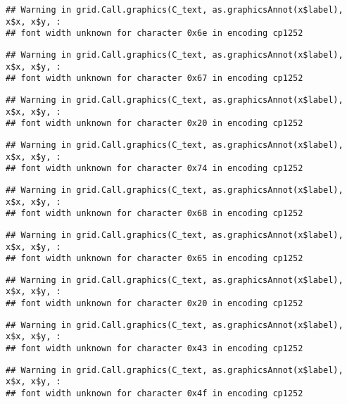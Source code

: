 \documentclass[
]{article}
\begin{document}
\begin{verbatim}
## Warning in grid.Call.graphics(C_text, as.graphicsAnnot(x$label), x$x, x$y, :
## font width unknown for character 0x6e in encoding cp1252
\end{verbatim}

\begin{verbatim}
## Warning in grid.Call.graphics(C_text, as.graphicsAnnot(x$label), x$x, x$y, :
## font width unknown for character 0x67 in encoding cp1252
\end{verbatim}

\begin{verbatim}
## Warning in grid.Call.graphics(C_text, as.graphicsAnnot(x$label), x$x, x$y, :
## font width unknown for character 0x20 in encoding cp1252
\end{verbatim}

\begin{verbatim}
## Warning in grid.Call.graphics(C_text, as.graphicsAnnot(x$label), x$x, x$y, :
## font width unknown for character 0x74 in encoding cp1252
\end{verbatim}

\begin{verbatim}
## Warning in grid.Call.graphics(C_text, as.graphicsAnnot(x$label), x$x, x$y, :
## font width unknown for character 0x68 in encoding cp1252
\end{verbatim}

\begin{verbatim}
## Warning in grid.Call.graphics(C_text, as.graphicsAnnot(x$label), x$x, x$y, :
## font width unknown for character 0x65 in encoding cp1252
\end{verbatim}

\begin{verbatim}
## Warning in grid.Call.graphics(C_text, as.graphicsAnnot(x$label), x$x, x$y, :
## font width unknown for character 0x20 in encoding cp1252
\end{verbatim}

\begin{verbatim}
## Warning in grid.Call.graphics(C_text, as.graphicsAnnot(x$label), x$x, x$y, :
## font width unknown for character 0x43 in encoding cp1252
\end{verbatim}

\begin{verbatim}
## Warning in grid.Call.graphics(C_text, as.graphicsAnnot(x$label), x$x, x$y, :
## font width unknown for character 0x4f in encoding cp1252
\end{verbatim}
\end{document}
